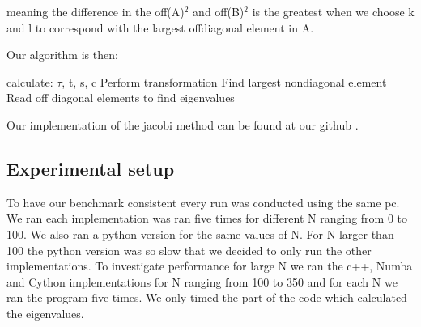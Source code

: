 meaning the difference in the off(A)$^2$ and off(B)$^2$ is the greatest
when we choose k and l to correspond with the largest offdiagonal element in A.

Our algorithm is then:

\begin{algorithmic}
    \State calculate: $\tau$, t, s, c
    \State Perform transformation
    \State Find largest nondiagonal element
  \EndWhile
  \State Read off diagonal elements to find eigenvalues
\end{algorithmic}


Our implementation of the jacobi method can be found at our github \cite{github}.

\subsection*{Experimental setup}
To have our benchmark consistent every run was conducted using the same pc. We
ran each implementation was ran five times for different N ranging from 0 to
100. We also ran a python version for the same values of N. For N larger than
100 the python version was so slow that we decided to only run the other
implementations. To investigate performance for large N we ran the c++, Numba
and Cython implementations for N ranging from 100 to 350 and for each N we
ran the program five times. We only timed the part of the code which calculated
the eigenvalues.
